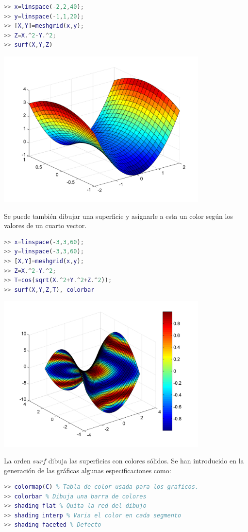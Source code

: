\begin{lstlisting}[language=Matlab]
>> x=linspace(-2,2,40);
>> y=linspace(-1,1,20);
>> [X,Y]=meshgrid(x,y);
>> Z=X.^2-Y.^2;
>> surf(X,Y,Z)
\end{lstlisting}
\begin{center}
\includegraphics[width=300pt]{./Imagenes/surface1.png}
\end{center}

Se puede también dibujar una superficie y asignarle a esta un color según los valores de un cuarto vector.

\begin{lstlisting}[language=Matlab]
>> x=linspace(-3,3,60);
>> y=linspace(-3,3,60);
>> [X,Y]=meshgrid(x,y);
>> Z=X.^2-Y.^2;
>> T=cos(sqrt(X.^2+Y.^2+Z.^2));
>> surf(X,Y,Z,T), colorbar
\end{lstlisting}
\begin{center}
\includegraphics[width=300pt]{./Imagenes/surface2.png}
\end{center}

La orden $surf$ dibuja las superficies con colores sólidos. Se han introducido en la generación de las gráficas algunas especificaciones como:
\begin{lstlisting}[language=Matlab]
>> colormap(C) % Tabla de color usada para los graficos.
>> colorbar % Dibuja una barra de colores
>> shading flat % Quita la red del dibujo
>> shading interp % Varia el color en cada segmento
>> shading faceted % Defecto
\end{lstlisting}

